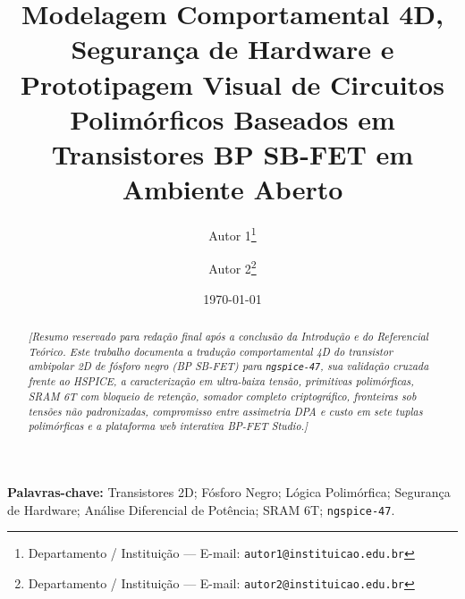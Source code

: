 \documentclass[11pt,a4paper]{article}
\title{\textbf{Modelagem Comportamental 4D, Seguran\c{c}a de Hardware e Prototipagem Visual de Circuitos Polim\'{o}rficos Baseados em Transistores BP SB-FET em Ambiente Aberto}}
\author{
  Autor 1\thanks{Departamento / Institui\c{c}\~{a}o --- E-mail: \texttt{autor1@instituicao.edu.br}} \and
  Autor 2\thanks{Departamento / Institui\c{c}\~{a}o --- E-mail: \texttt{autor2@instituicao.edu.br}}
}
\date{\today}
\begin{document}
\maketitle

\begin{abstract}
\noindent\textit{[Resumo reservado para reda\c{c}\~{a}o final ap\'{o}s a conclus\~{a}o da Introdu\c{c}\~{a}o e do Referencial Te\'{o}rico. Este trabalho documenta a tradu\c{c}\~{a}o comportamental 4D do transistor ambipolar 2D de f\'{o}sforo negro (BP SB-FET) para \texttt{ngspice-47}, sua valida\c{c}\~{a}o cruzada frente ao HSPICE, a caracteriza\c{c}\~{a}o em ultra-baixa tens\~{a}o, primitivas polim\'{o}rficas, SRAM 6T com bloqueio de reten\c{c}\~{a}o, somador completo criptogr\'{a}fico, fronteiras sob tens\~{o}es n\~{a}o padronizadas, compromisso entre assimetria DPA e custo em sete tuplas polim\'{o}rficas e a plataforma web interativa BP-FET Studio.]}
\end{abstract}

\vspace{0.5em}
\noindent\textbf{Palavras-chave:} Transistores 2D; F\'{o}sforo Negro; L\'{o}gica Polim\'{o}rfica; Seguran\c{c}a de Hardware; An\'{a}lise Diferencial de Pot\^{e}ncia; SRAM 6T; \texttt{ngspice-47}.









\end{document}
